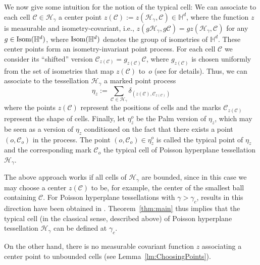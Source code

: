 \documentclass[12pt,a4paper]{article}
\theoremstyle{definition}
\renewcommand{\H}{\mathbb{H}}
\begin{document}
We now give some intuition for the notion of the typical cell:
We can associate to each cell $\mathcal{C}\in \mathcal{H}_{\gamma}$ a center point $z(\mathcal{C}):=z(\mathcal{H}_{\gamma},\mathcal{C})\in \H^d$, where the function $z$ is measurable and isometry-covariant, i.e., $z(g\mathcal{H}_{\gamma},g\mathcal{C})=gz(\mathcal{H}_{\gamma},\mathcal{C})$ for any $g\in{\rm Isom}(\mathbb{H}^d)$, where ${\rm Isom}(\mathbb{H}^d)$ denotes the group of isometries of $\mathbb{H}^d$.
These center points form an isometry-invariant point process. For each cell $\mathcal{C}$ we consider its ``shifted''  version $\mathcal{C}_{z(\mathcal{C})}=g_{z(\mathcal{C})}\mathcal{C}$, where $g_{z(\mathcal{C})}$ is chosen uniformly from the set of isometries that map $z(\mathcal{C})$ to~$o$ (see \cite{Last10} for details).
Thus, we can associate to the tessellation $\mathcal{H}_{\gamma}$ a marked point process 
\[
\eta_z:=\sum_{\mathcal{C}\in \mathcal{H}_{\gamma}}\delta_{(z(\mathcal{C}),\mathcal{C}_{z(\mathcal{C})})}
\]
where the points $z(\mathcal{C})$ represent the positions of cells and the marks $\mathcal{C}_{z(\mathcal{C})}$ represent the shape of cells.
Finally, let $\eta^o_z$ be the Palm version of $\eta_z$, which may be seen as a version of $\eta_z$ conditioned on the fact that there exists a point $(o,\mathcal{C}_o)$ in the process.
The point $(o,\mathcal{C}_o) \in \eta_z^o$ is called the typical point of $\eta_z$ and the corresponding mark $\mathcal{C}_o$ the typical cell of Poisson hyperplane tessellation $\mathcal{H}_{\gamma}$. 

The above approach works if all cells of $\mathcal{H}_{\gamma}$ are bounded, since in this case we may choose a center $z(\mathcal{C})$ to be, for example, the center of the smallest ball containing $\mathcal{C}$.
For Poisson hyperplane tessellations with $\gamma > \gamma_c$, results in this direction have been obtained in \cite[Section 5.4]{Herold2021}.
Theorem~\ref{thm:main} thus implies that the typical cell (in the classical sense, described above) of Poisson hyperplane tessellation $\mathcal{H}_{\gamma}$ can be defined at $\gamma_c$.

On the other hand, there is no measurable covariant function $z$ associating a center point to unbounded cells (see Lemma~\ref{lm:ChoosingPoints}).
\end{document}
